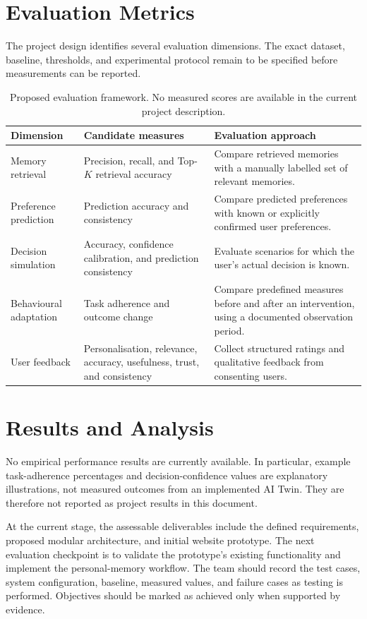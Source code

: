 \documentclass{tietreport}
\begin{document}
\section{Evaluation Metrics}
The project design identifies several evaluation dimensions. The exact dataset, baseline, thresholds, and experimental protocol remain to be specified before measurements can be reported.
\begin{table}[htbp]
\centering
\small
\begin{tabular}{p{35mm}p{52mm}p{49mm}}
\toprule
\textbf{Dimension} & \textbf{Candidate measures} & \textbf{Evaluation approach} \\
\midrule
Memory retrieval & Precision, recall, and Top-$K$ retrieval accuracy & Compare retrieved memories with a manually labelled set of relevant memories. \\
Preference prediction & Prediction accuracy and consistency & Compare predicted preferences with known or explicitly confirmed user preferences. \\
Decision simulation & Accuracy, confidence calibration, and prediction consistency & Evaluate scenarios for which the user's actual decision is known. \\
Behavioural adaptation & Task adherence and outcome change & Compare predefined measures before and after an intervention, using a documented observation period. \\
User feedback & Personalisation, relevance, accuracy, usefulness, trust, and consistency & Collect structured ratings and qualitative feedback from consenting users. \\
\bottomrule
\end{tabular}
\caption{Proposed evaluation framework. No measured scores are available in the current project description.}
\label{tab:metrics}
\end{table}

\section{Results and Analysis}
No empirical performance results are currently available. In particular, example task-adherence percentages and decision-confidence values are explanatory illustrations, not measured outcomes from an implemented AI Twin. They are therefore not reported as project results in this document.

At the current stage, the assessable deliverables include the defined requirements, proposed modular architecture, and initial website prototype. The next evaluation checkpoint is to validate the prototype's existing functionality and implement the personal-memory workflow. The team should record the test cases, system configuration, baseline, measured values, and failure cases as testing is performed. Objectives should be marked as achieved only when supported by evidence.
\end{document}
